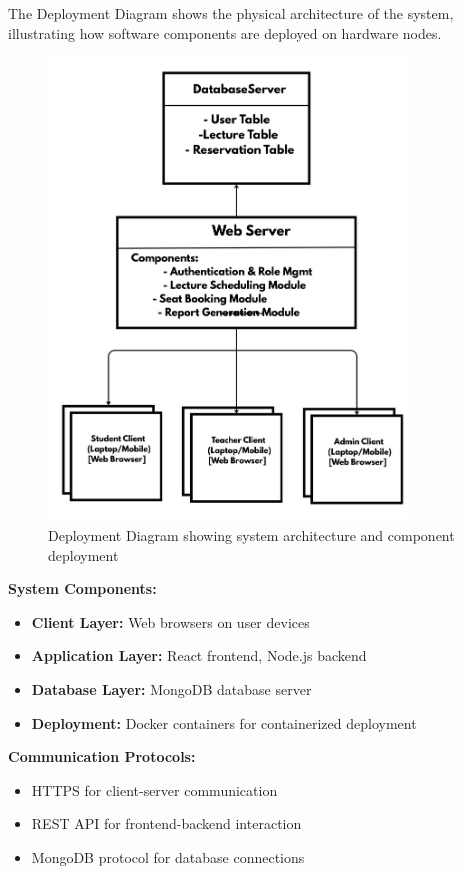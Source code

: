 The Deployment Diagram shows the physical architecture of the system, illustrating how software components are deployed on hardware nodes.

\begin{figure}[h]
    \centering
    \includegraphics[width=0.85\textwidth]{images/Deployment Diagram.jpg}
    \caption{Deployment Diagram showing system architecture and component deployment}
    \label{fig:deployment}
\end{figure}

\textbf{System Components:}
\begin{itemize}[leftmargin=*]
    \item \textbf{Client Layer:} Web browsers on user devices
    \item \textbf{Application Layer:} React frontend, Node.js backend
    \item \textbf{Database Layer:} MongoDB database server
    \item \textbf{Deployment:} Docker containers for containerized deployment
\end{itemize}

\textbf{Communication Protocols:}
\begin{itemize}[leftmargin=*]
    \item HTTPS for client-server communication
    \item REST API for frontend-backend interaction
    \item MongoDB protocol for database connections
\end{itemize}

